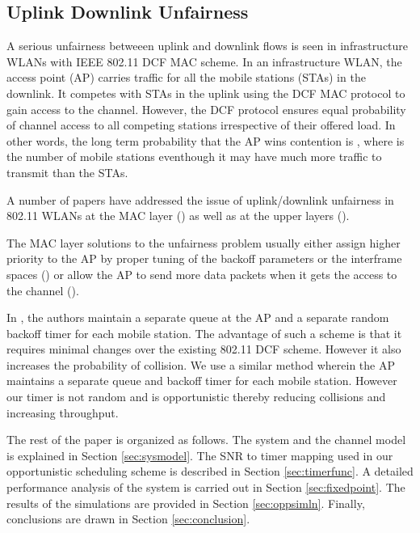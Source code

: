 \documentclass[10pt,conference]{IEEEtran}
\begin{document}
\subsection{Uplink Downlink Unfairness}
\label{sec:ul_dl}
A serious unfairness betweeen uplink and downlink flows is seen in infrastructure WLANs with IEEE 802.11 DCF MAC scheme.
In an infrastructure WLAN, the access point (AP) carries traffic for all the mobile stations (STAs) in the downlink. 
It competes with STAs in the uplink using the DCF MAC protocol to gain access to the channel. 
However, the DCF protocol ensures equal probability of channel access to all competing stations irrespective of their offered load. In other words, the long term probability that the AP wins contention is ,
where   is the number of mobile stations eventhough it may have much more traffic to transmit than the STAs.  

A number of papers have addressed the issue of uplink/downlink unfairness in 802.11 WLANs at the MAC layer (\cite{lopez2008,hirantha2008dynamic,kim2005downlink,gopalakrishnan2004,keceliweighted}) 
as well as at the upper layers (\cite{pilosof2003understanding,wu2005upstream,ha2006wlc29}).

The MAC layer solutions to the unfairness problem usually either assign higher priority to the AP by proper tuning of the backoff parameters or the interframe spaces (\cite{lopez2008,hirantha2008dynamic,kim2005downlink}) or 
allow the AP to send more data packets when it gets the access to the channel (\cite{gopalakrishnan2004,keceliweighted,hiraguri2013}). 

In \cite{siwam2008}, the authors maintain a separate queue at the AP and a separate random backoff timer for each mobile station.
The advantage of such a scheme is that it requires minimal changes over the existing 802.11 DCF scheme.
However it also increases the probability of collision. 
We use a similar method wherein the AP maintains a separate queue and backoff timer for each mobile station. 
However our timer is not random  and is opportunistic thereby reducing collisions and increasing throughput. 

The rest of the paper is organized as follows. The system
and the channel model is explained in Section \ref{sec:sysmodel}. 
The SNR to timer mapping used in our opportunistic scheduling scheme is described in Section \ref{sec:timerfunc}. 
A detailed performance analysis of the system is carried out
in Section \ref{sec:fixedpoint}. The results of the simulations are provided in
Section \ref{sec:oppsimln}. Finally, conclusions are drawn in Section \ref{sec:conclusion}.
\end{document}
